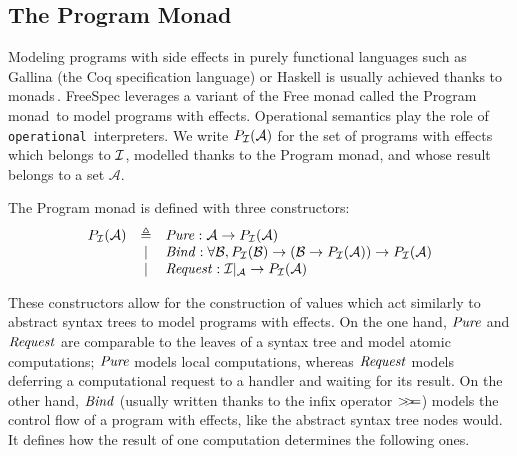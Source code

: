 
\subsection{The Program Monad}

Modeling programs with side effects in purely functional languages such as
{\textsc Gallina} (the Coq specification language) or Haskell is usually
achieved thanks to monads\,\cite{hoareetal2001monad}.
%
FreeSpec leverages a variant of the Free monad called the Program
monad\,\cite{operational} to model programs with effects. Operational semantics
play the role of \texttt{operational}\,\cite{operational} interpreters.
%
We write $P_{\mathcal{I}}(\mathcal{A})$ for the set of programs with effects which
belongs to $\mathcal{I}$, modelled thanks to the Program monad, and whose result belongs
to a set $\mathcal{A}$.

\begin{definition}
  The Program monad is defined with three constructors:
  \[
    \begin{array}{rcl}
      P_{\mathcal{I}}(\mathcal{A})
      & \triangleq
      & \mathit{Pure} : \mathcal{A} \rightarrow P_{\mathcal{I}}(\mathcal{A}) \\

      & |
      & \mathit{Bind} : \forall \mathcal{B}, P_{\mathcal{I}}(\mathcal{B}) \rightarrow
        (\mathcal{B} \rightarrow P_{\mathcal{I}}(\mathcal{A})) \rightarrow
        P_{\mathcal{I}}(\mathcal{A}) \\

      & |
      & \mathit{Request} : \mathcal{I}|_{\mathcal{A}} \rightarrow
        P_{\mathcal{I}}(\mathcal{A})
    \end{array}
  \]
\end{definition}
%
These constructors allow for the construction of values which act similarly to
abstract syntax trees to model programs with effects.
%
On the one hand, $\mathit{Pure}$ and $\mathit{Request}$ are comparable to the leaves
of a syntax tree and model atomic computations; $\mathit{Pure}$ models local
computations, whereas $\mathit{Request}$ models deferring a computational request
to a handler and waiting for its result.
%
On the other hand, $\mathit{Bind}$ (usually written thanks to the infix operator
$>\!\!>\!\!=$) models the control flow of a program with effects, like the abstract
syntax tree nodes would.
%
It defines how the result of one computation determines the following ones.

